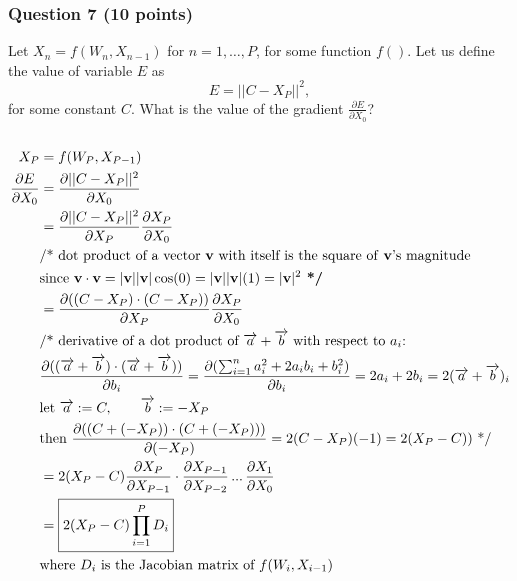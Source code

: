 \documentclass[12pt, border = 4pt, multi]{article} %
\begin{document}
\subsubsection*{Question 7 (10 points)}
Let $X_n = f(W_n, X_{n-1})$ for 
$n = 1, \ldots, P$, for some 
function $f()$. Let us define the 
value of variable $E$ as 
\begin{equation}
     E = ||C - X_P||^2,
\end{equation}
for some constant $C$. 
What is the value of the gradient 
$\frac{\partial E}{\partial X_0}$?\\
\\
\begin{align*}
X_P &= f(W_P, X_{P - 1})\\
\frac{\partial E}{\partial X_0} &= \frac{\partial||C - X_P|| ^ 2}{\partial X_0}\\
&= \frac{\partial||C - X_P|| ^ 2}{\partial X_P} \frac{\partial X_P}{\partial X_0}\\
&\text{/* dot product of a vector \textbf{v} with itself is the square of \textbf{v}'s magnitude}\\
&\text{since }\textbf{v} \cdot \textbf{v} = |\textbf{v}||\textbf{v}|\cos(0) = |\textbf{v}||\textbf{v}|(1) = |\textbf{v}| ^ 2 \textbf{ */}\\
&= \frac{\partial((C - X_P)\cdot(C - X_P))}{\partial X_P} \frac{\partial X_P}{\partial X_0}\\
&\text{/* derivative of a dot product of $\overrightarrow{a} + \overrightarrow{b}$ with respect to $a_i$:}\\
&\frac{\partial((\overrightarrow{a} + \overrightarrow{b}) \cdot (\overrightarrow{a} + \overrightarrow{b}))}{\partial b_i}
= \frac{\partial(\sum_{i = 1} ^ n a_i ^ 2 + 2a_i b_i + b_i ^ 2)}{\partial b_i}
= 2a_i + 2b_i
= 2(\overrightarrow{a} + \overrightarrow{b})_i\\
&\text{let } \overrightarrow{a} := C, \qquad \overrightarrow{b} := -X_P\\
&\text{then } \frac{\partial((C + (-X_P))\cdot(C + (-X_P)))}{\partial (-X_P)} = 2(C - X_P)(-1) = 2(X_P - C))\text{ */}\\
&= 2(X_P - C)\frac{\partial X_P}{\partial X_{P - 1}}\cdot\frac{\partial X_{P - 1}}{\partial X_{P - 2}} \,...\, \frac{\partial X_1}{\partial X_0}\\
&= \boxed{2(X_P - C)\prod_{i = 1} ^ P D_i}\\
&\text{where } D_i \text{ is the Jacobian matrix of } f(W_i, X_{i - 1})
\end{align*}
\end{document}
